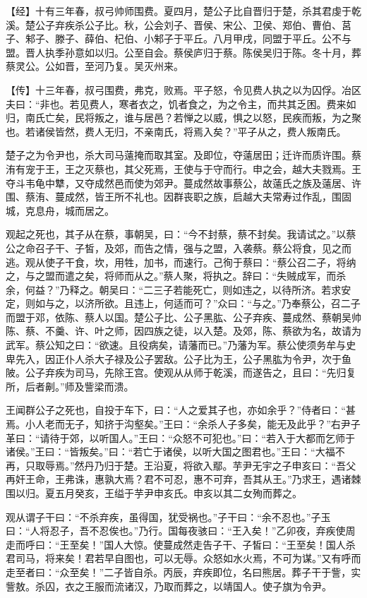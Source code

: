 \documentclass[]{article}
\begin{document}
【经】十有三年春，叔弓帅师围费。夏四月，楚公子比自晋归于楚，杀其君虔于乾溪。楚公子弃疾杀公子比。秋，公会刘子、晋侯、宋公、卫侯、郑伯、曹伯、莒子、邾子、滕子、薛伯、杞伯、小邾子于平丘。八月甲戌，同盟于平丘。公不与盟。晋人执季孙意如以归。公至自会。蔡侯庐归于蔡。陈侯吴归于陈。冬十月，葬蔡灵公。公如晋，至河乃复。吴灭州来。

【传】十三年春，叔弓围费，弗克，败焉。平子怒，令见费人执之以为囚俘。冶区夫曰：``非也。若见费人，寒者衣之，饥者食之，为之令主，而共其乏困。费来如归，南氏亡矣，民将叛之，谁与居邑？若惮之以威，惧之以怒，民疾而叛，为之聚也。若诸侯皆然，费人无归，不亲南氏，将焉入矣？''平子从之，费人叛南氏。

楚子之为令尹也，杀大司马薳掩而取其室。及即位，夺薳居田；迁许而质许围。蔡洧有宠于王，王之灭蔡也，其父死焉，王使与于守而行。申之会，越大夫戮焉。王夺斗韦龟中犨，又夺成然邑而使为郊尹。蔓成然故事蔡公，故薳氏之族及薳居、许围、蔡洧、蔓成然，皆王所不礼也。因群丧职之族，启越大夫常寿过作乱，围固城，克息舟，城而居之。

观起之死也，其子从在蔡，事朝吴，曰：``今不封蔡，蔡不封矣。我请试之。''以蔡公之命召子干、子皙，及郊，而告之情，强与之盟，入袭蔡。蔡公将食，见之而逃。观从使子干食，坎，用牲，加书，而速行。己徇于蔡曰：``蔡公召二子，将纳之，与之盟而遣之矣，将师而从之。''蔡人聚，将执之。辞曰：``失贼成军，而杀余，何益？''乃释之。朝吴曰：``二三子若能死亡，则如违之，以待所济。若求安定，则如与之，以济所欲。且违上，何适而可？''众曰：``与之。''乃奉蔡公，召二子而盟于邓，依陈、蔡人以国。楚公子比、公子黑肱、公子弃疾、蔓成然、蔡朝吴帅陈、蔡、不羹、许、叶之师，因四族之徒，以入楚。及郊，陈、蔡欲为名，故请为武军。蔡公知之曰：``欲速。且役病矣，请藩而已。''乃藩为军。蔡公使须务牟与史卑先入，因正仆人杀大子禄及公子罢敌。公子比为王，公子黑肱为令尹，次于鱼陂。公子弃疾为司马，先除王宫。使观从从师于乾溪，而遂告之，且曰：``先归复所，后者劓。''师及訾梁而溃。

王闻群公子之死也，自投于车下，曰：``人之爱其子也，亦如余乎？''侍者曰：``甚焉。小人老而无子，知挤于沟壑矣。''王曰：``余杀人子多矣，能无及此乎？''右尹子革曰：``请待于郊，以听国人。''王曰：``众怒不可犯也。''曰：``若入于大都而乞师于诸侯。''王曰：``皆叛矣。''曰：``若亡于诸侯，以听大国之图君也。''王曰：``大福不再，只取辱焉。''然丹乃归于楚。王沿夏，将欲入鄢。芋尹无宇之子申亥曰：``吾父再奸王命，王弗诛，惠孰大焉？君不可忍，惠不可弃，吾其从王。''乃求王，遇诸棘围以归。夏五月癸亥，王缢于芋尹申亥氏。申亥以其二女殉而葬之。

观从谓子干曰：``不杀弃疾，虽得国，犹受祸也。''子干曰：``余不忍也。''子玉曰：``人将忍子，吾不忍俟也。''乃行。国每夜骇曰：``王入矣！''乙卯夜，弃疾使周走而呼曰：``王至矣！''国人大惊。使蔓成然走告子干、子皙曰：``王至矣！国人杀君司马，将来矣！君若早自图也，可以无辱。众怒如水火焉，不可为谋。''又有呼而走至者曰：``众至矣！''二子皆自杀。丙辰，弃疾即位，名曰熊居。葬子干于訾，实訾敖。杀囚，衣之王服而流诸汉，乃取而葬之，以靖国人。使子旗为令尹。
\end{document}
